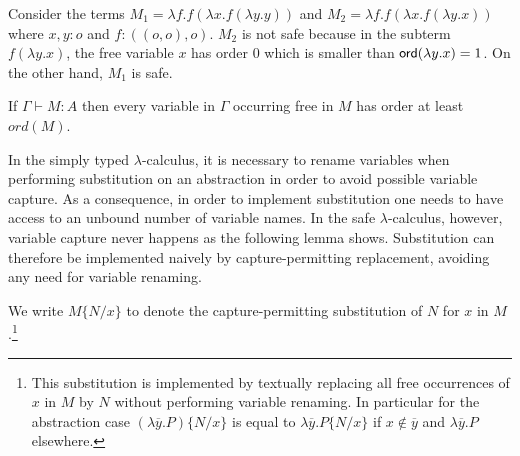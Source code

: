 \documentclass{llncs}
\newcommand\captsubst[2]{\{#1/#2 \}}
\newcommand\dps{\displaystyle}
\newcommand\rulef[2]{\frac{\dps #1}{\dps #2}}
\newcommand\ord[1]{{\sf ord}(#1)}
\begin{document}
\begin{example}
\label{ex:kierstead}
Consider the terms $M_1 = \lambda f . f (\lambda x . f (\lambda y . y ))$ and
$M_2 = \lambda f . f (\lambda x . f (\lambda y .x ))$ where $x,y:o$ and $f:((o,o),o)$.
$M_2$ is not safe because in the subterm $f (\lambda y . x)$, the free variable $x$ has order $0$ which is smaller than $\ord{\lambda y . x} = 1$.
On the other hand, $M_1$ is safe.
\end{example}

\begin{lemma}
\label{lem:ordfreevar}
If $\Gamma \vdash M : A$ then every variable in $\Gamma$ occurring free in $M$ has order at least $ord(M)$.
\end{lemma}




In the simply typed $\lambda$-calculus, it is necessary to rename
variables when performing substitution on an abstraction in order to
avoid possible variable capture. As a consequence, in order to
implement substitution one needs to have access to an unbound number
of variable names.
In the safe $\lambda$-calculus, however, variable capture never happens as the following lemma shows. Substitution can therefore be implemented naively by capture-permitting replacement, avoiding any need for variable renaming.


We write $M\captsubst{N}{x}$ to denote the capture-permitting substitution of $N$ for $x$ in $M$.\footnote{This substitution is implemented
by textually replacing all free occurrences of $x$ in $M$ by $N$ without performing variable renaming.
In particular for the abstraction case
$(\lambda \overline{y} . P)\captsubst{N}{x}$ is
equal to $\lambda \overline{y} . P\captsubst{N}{x}$ if $x\not\in \overline{y}$ and $\lambda \overline{y} . P$ elsewhere.}
\end{document}

